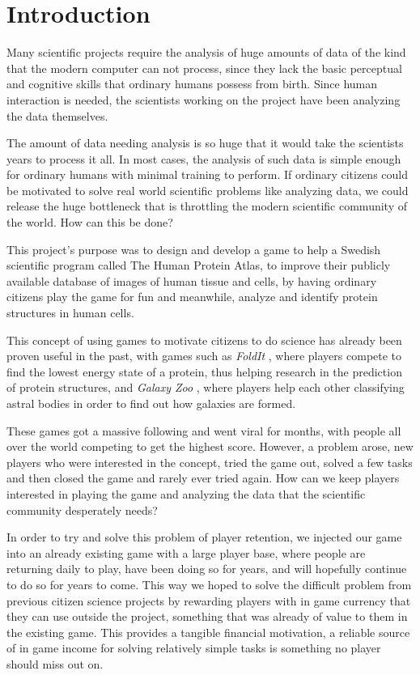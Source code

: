 \section{Introduction}\label{sec:introduction}

Many scientific projects require the analysis of huge amounts of data of the kind that the modern computer can not process, since they lack the basic perceptual and cognitive skills that ordinary humans possess from birth. Since human interaction is needed, the scientists working on the project have been analyzing the data themselves.

The amount of data needing analysis is so huge that it would take the scientists years to process it all. In most cases, the analysis of such data is simple enough for ordinary humans with minimal training to perform. If ordinary citizens could be motivated to solve real world scientific problems like analyzing data, we could release the huge bottleneck that is throttling the modern scientific community of the world. How can this be done?

This project's purpose was to design and develop a game to help a Swedish scientific program called The Human Protein Atlas, to improve their publicly available database of images of human tissue and cells, by having ordinary citizens play the game for fun and meanwhile, analyze and identify protein structures in human cells.

This concept of using games to motivate citizens to do science has already been proven useful in the past, with games such as \emph{FoldIt} \cite{foldit}, where players compete to find the lowest energy state of a protein, thus helping research in the prediction of protein structures, and \emph{Galaxy Zoo} \cite{galaxyzoo}, where players help each other classifying astral bodies in order to find out how galaxies are formed.

These games got a massive following and went viral for months, with people all over the world competing to get the highest score. However, a problem arose, new players who were interested in the concept, tried the game out, solved a few tasks and then closed the game and rarely ever tried again. How can we keep players interested in playing the game and analyzing the data that the scientific community desperately needs?

In order to try and solve this problem of player retention, we injected our game into an already existing game with a large player base, where people are returning daily to play, have been doing so for years, and will hopefully continue to do so for years to come. This way we hoped to solve the difficult problem from previous citizen science projects by rewarding players with in game currency that they can use outside the project, something that was already of value to them in the existing game. This provides a tangible financial motivation, a reliable source of in game income for solving relatively simple tasks is something no player should miss out on.

